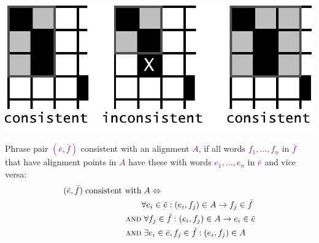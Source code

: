 \documentclass[landscape]{slides}
\newcommand{\maths}[1]{\textcolor{purple}{#1}}
\begin{document}
\vspace{5mm}
\begin{center}
\includegraphics[scale=1]{consistent-with-unaligned-bw.pdf}\vspace{-2mm}
\end{center}
Phrase pair \maths{$(\bar{e},\bar{f})$} consistent with an alignment \maths{$A$}, if all words \maths{$f_1,...,f_n$} in \maths{$\bar{f}$} that have alignment points in \maths{$A$ }have these with words \maths{$e_1,...,e_n$} in \maths{$\bar{e}$} and vice versa:\vspace{-3mm}
\maths{\begin{equation*}
\begin{split}
( \bar{e} , \bar{f} ) \; \mbox{consistent with} & \; A \Leftrightarrow \\
 &    \forall e_i \in \bar{e}: (e_i,f_j) \in A \rightarrow f_j \in \bar{f} \\
 \mbox{\sc and} 
 & \; \forall f_j \in \bar{f}: (e_i,f_j) \in A \rightarrow e_i \in \bar{e} \\
 \mbox{\sc and} 
 & \; \exists e_i \in \bar{e}, f_j \in \bar{f}: (e_i,f_j) \in A
\end{split}
\end{equation*}}


\end{document}
